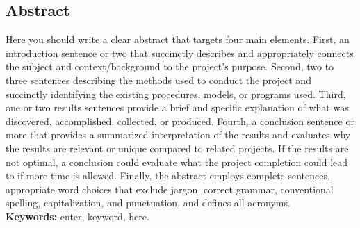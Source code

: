 \begin{center}
  \section*{Abstract}
\end{center}


\begin{spacing}{1.5}  
  Here you should write a clear abstract that targets four main elements. First, an introduction sentence or two that succinctly describes and appropriately connects the subject and context/background to the project's purpose. Second, two to three sentences describing the methods used to conduct the project and succinctly identifying the existing procedures, models, or programs used. Third, one or two results sentences provide a brief and specific explanation of what was discovered, accomplished, collected, or produced. Fourth, a conclusion sentence or more that provides a summarized interpretation of the results and evaluates why the results are relevant or unique compared to related projects. If the results are not optimal, a conclusion could evaluate what the project completion could lead to if more time is allowed. Finally, the abstract employs complete sentences, appropriate word choices that exclude jargon, correct grammar, conventional spelling, capitalization, and punctuation, and defines all acronyms.\\
  
  {\bf Keywords:} enter, keyword, here.
\end{spacing}
\clearpage